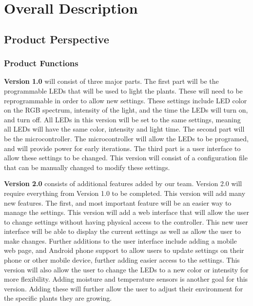 \documentclass[onecolumn, draftclsnofoot,10pt, compsoc]{IEEEtran}
\begin{document}
	\section{Overall Description}
		\subsection{Product Perspective}

		\subsubsection{Product Functions}
		\noindent \textbf{Version 1.0} will consist of three major parts. The first part will be the programmable LEDs that will be used to light the plants. These will need to be reprogrammable in order to allow new settings.
		These settings include LED color on the RGB spectrum, intensity of the light, and the time the LEDs will turn on, and turn off. All LEDs in this version will be set to the same settings, meaning all
		LEDs will have the same color, intensity and light time. The second part will be the microcontroller. The microcontroller will allow the LEDs to be programed, and will provide power for early iterations.
		The third part is a user interface to allow these settings to be changed. This version will consist of a configuration file that can be manually changed to modify these settings.

		\noindent \textbf{Version 2.0} consists of additional features added by our team. Version 2.0 will require everything from Version 1.0 to be completed. This version will add many new features. The first, and most
		important feature will be an easier way to manage the settings. This version will add a web interface that will allow the user to change settings without having physical access to the controller.
		This new user interface will be able to display the current settings as well as allow the user to make changes. Further additions to the user interface include adding a mobile web page, and Android
		phone support to allow users to update settings on their phone or other mobile device, further adding easier access to the settings. This version will also allow the user to change the LEDs to a new color or intensity for more flexibility. Adding moisture and temperature sensors is another goal for this version. Adding these will further allow the user to adjust
		their environment for the specific plants they are growing.
\end{document}
